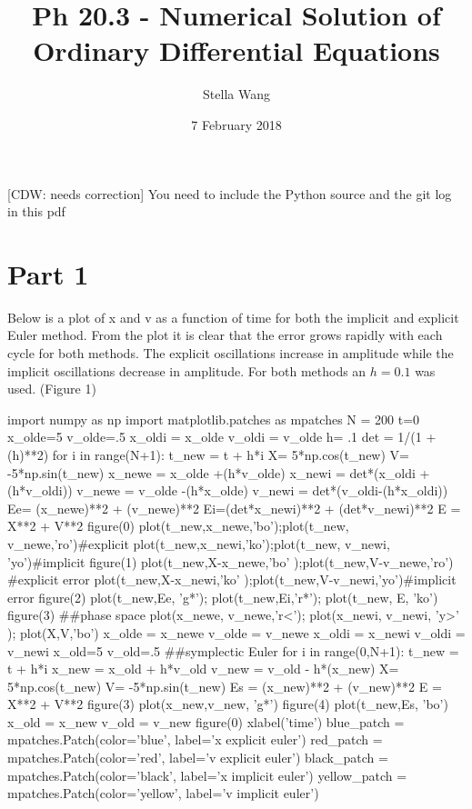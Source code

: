 \documentclass{article}
\title{Ph 20.3 - Numerical Solution of Ordinary Differential Equations
\\\correct{}}
\author{Stella Wang}
\date{ 7 February 2018}
\newcommand{\correct}[1]
           {{\color{red} [CDW: needs correction] #1}}
\begin{document}
\maketitle
\correct{You need to include the Python source and the git log in this pdf}
\section{Part 1}

Below is a plot of x and v as a function of time for both the implicit and explicit Euler method. From the plot it is clear that the error grows rapidly with each cycle for both methods. The explicit oscillations increase in amplitude while the implicit oscillations decrease in amplitude. For both methods an $h = 0.1$ was used. (Figure 1)

\begin{pylabcode}[firstsession]
import numpy as np
import matplotlib.patches as mpatches
N = 200
t=0
x_olde=5
v_olde=.5
x_oldi = x_olde
v_oldi = v_olde
h= .1
det = 1/(1 + (h)**2)
for i in range(N+1): 
    t_new = t + h*i
    X= 5*np.cos(t_new)
    V= -5*np.sin(t_new)
    x_newe = x_olde +(h*v_olde)
    x_newi = det*(x_oldi +(h*v_oldi))
    v_newe = v_olde -(h*x_olde)
    v_newi = det*(v_oldi-(h*x_oldi))
    Ee= (x_newe)**2 + (v_newe)**2
    Ei=(det*x_newi)**2 + (det*v_newi)**2
    E = X**2 + V**2
    figure(0)
    plot(t_new,x_newe,'bo');plot(t_new, v_newe,'ro')#explicit
    plot(t_new,x_newi,'ko');plot(t_new, v_newi, 'yo')#implicit
    figure(1)
    plot(t_new,X-x_newe,'bo' );plot(t_new,V-v_newe,'ro') #explicit error
    plot(t_new,X-x_newi,'ko' );plot(t_new,V-v_newi,'yo')#implicit error
    figure(2)
    plot(t_new,Ee, 'g*'); plot(t_new,Ei,'r*'); plot(t_new, E, 'ko')
    figure(3)
    ##phase space
    plot(x_newe, v_newe,'r<'); plot(x_newi, v_newi, 'y>' ); plot(X,V,'bo')
    x_olde = x_newe
    v_olde = v_newe
    x_oldi = x_newi
    v_oldi = v_newi
x_old=5
v_old=.5  
##symplectic Euler
for i in range(0,N+1):
    t_new = t + h*i
    x_new = x_old + h*v_old
    v_new = v_old - h*(x_new)
    X= 5*np.cos(t_new)
    V= -5*np.sin(t_new)
    Es = (x_new)**2 + (v_new)**2
    E = X**2 + V**2
    figure(3)
    plot(x_new,v_new, 'g*')
    figure(4)
    plot(t_new,Es, 'bo')
    x_old = x_new
    v_old = v_new
figure(0)
xlabel('time')
blue_patch = mpatches.Patch(color='blue', label='x explicit euler')
red_patch = mpatches.Patch(color='red', label='v explicit euler')
black_patch = mpatches.Patch(color='black', label='x implicit euler')
yellow_patch = mpatches.Patch(color='yellow', label='v implicit euler')

\end{pylabcode}
\end{document}
